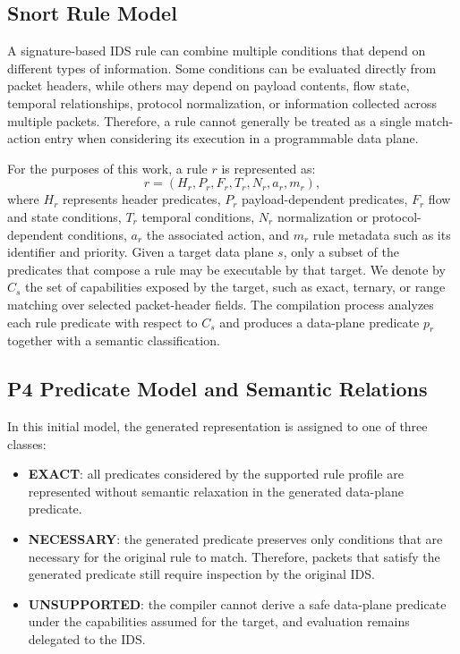 \documentclass{article}
\begin{document}
\subsection{Snort Rule Model}
A signature-based IDS rule can combine multiple conditions that depend
on different types of information. Some conditions can be evaluated
directly from packet headers, while others may depend on payload
contents, flow state, temporal relationships, protocol normalization,
or information collected across multiple packets. Therefore, a rule
cannot generally be treated as a single match-action entry when
considering its execution in a programmable data plane.

For the purposes of this work, a rule $r$ is represented as:
\[
r = (H_r, P_r, F_r, T_r, N_r, a_r, m_r),
\]
where $H_r$ represents header predicates, $P_r$ payload-dependent
predicates, $F_r$ flow and state conditions, $T_r$ temporal conditions,
$N_r$ normalization or protocol-dependent conditions, $a_r$ the
associated action, and $m_r$ rule metadata such as its identifier and
priority.
Given a target data plane $s$, only a subset of the predicates that
compose a rule may be executable by that target. We denote by $C_s$
the set of capabilities exposed by the target, such as exact, ternary,
or range matching over selected packet-header fields. The compilation
process analyzes each rule predicate with respect to $C_s$ and produces
a data-plane predicate $p_r$ together with a semantic classification.

\subsection{P4 Predicate Model and Semantic Relations}
In this initial model, the generated representation is assigned to one
of three classes:

\begin{itemize}
    \item \textbf{EXACT}: all predicates considered by the supported
    rule profile are represented without semantic relaxation in the
    generated data-plane predicate.

    \item \textbf{NECESSARY}: the generated predicate preserves only
    conditions that are necessary for the original rule to match.
    Therefore, packets that satisfy the generated predicate still
    require inspection by the original IDS.

    \item \textbf{UNSUPPORTED}: the compiler cannot derive a safe
    data-plane predicate under the capabilities assumed for the target,
    and evaluation remains delegated to the IDS.
\end{itemize}
\end{document}

